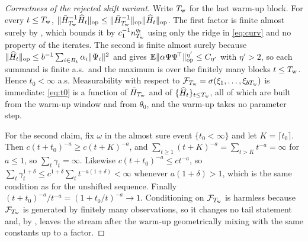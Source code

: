 \begin{proof}[Correctness of the rejected shift variant]
Write $T_{\mathrm w}$ for the last warm-up block. For every $t\le T_{\mathrm w}$,
$\lVert \bar{H}_{T_{\mathrm w}}^{-1}\widehat H_t \rVert_{\mathrm{op}}\le\lVert \bar{H}_{T_{\mathrm w}}^{-1} \rVert_{\mathrm{op}}\lVert \widehat H_t \rVert_{\mathrm{op}}$. The first factor is
finite almost surely by , which bounds it by $c_1^{-1}n_{T_{\mathrm w}}^{q_{\mathrm r}}$ using only
the ridge in \eqref{eq:curv} and no property of the iterates. The second is finite almost
surely because $\lVert \widehat H_t \rVert_{\mathrm{op}}\le b^{-1}\sum_{i\in B_t}\alpha_i\lVert \Psi_i \rVert^2$ and
 gives $\mathbb{E}\lVert \alpha\Psi\Psi^{\!\top} \rVert_{\mathrm{op}}^{\eta'}\le C_{\eta'}$ with
$\eta'>2$, so each summand is finite a.s.\ and the maximum is over the finitely many blocks
$t\le T_{\mathrm w}$. Hence $t_0<\infty$ a.s. Measurability with respect to
$\mathcal{F}_{T_{\mathrm w}}=\sigma(\xi_1,\dots,\xi_{bT_{\mathrm w}})$ is immediate: \eqref{eq:t0} is a function of
$\bar{H}_{T_{\mathrm w}}$ and of $\{\widehat H_t\}_{t\le T_{\mathrm w}}$, all of which are built from the warm-up window and
from $\theta_0$, and the warm-up takes no parameter step.

For the second claim, fix $\omega$ in the almost sure event $\{t_0<\infty\}$ and let
$K=\lceil t_0\rceil$. Then $c(t+t_0)^{-a}\ge c(t+K)^{-a}$, and
$\sum_{t\ge1}(t+K)^{-a}=\sum_{t>K}t^{-a}=\infty$ for $a\le1$, so $\sum_t\gamma_t=\infty$.
Likewise $c(t+t_0)^{-a}\le ct^{-a}$, so $\sum_t\gamma_t^{1+\delta}\le
c^{1+\delta}\sum_t t^{-a(1+\delta)}<\infty$ whenever $a(1+\delta)>1$, which is the same
condition as for the unshifted sequence. Finally $(t+t_0)^{-a}/t^{-a}=(1+t_0/t)^{-a}\to1$.
Conditioning on $\mathcal{F}_{T_{\mathrm w}}$ is harmless because $\mathcal{F}_{T_{\mathrm w}}$ is generated by
finitely many observations, so it changes no tail statement and, by , leaves the
stream after the warm-up geometrically mixing with the same constants up to a factor.


\end{proof}
